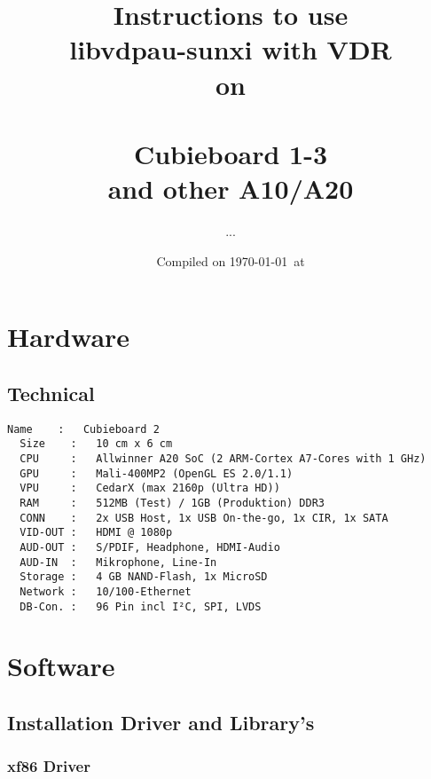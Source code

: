 \documentclass[11pt, a4paper,ngerman]{article}
\title{ Instructions to use \\ libvdpau-sunxi with VDR \\ on \\ \cubiebig \\ Cubieboard 1-3 \\ and other A10/A20}
\author{ ... }
\date{Compiled on \today\ at \currenttime}
\begin{document}
\maketitle
\newpage %
\tableofcontents 
\newpage %


\section{Hardware}
\subsection{Technical}
\begin{Verbatim}[frame=lines,
       framerule=0.2mm,framesep=3mm,
       rulecolor=\color{monoorange},
       fillcolor=\color{monogreen},
       label=\cubiebig,labelposition=topline]
  Name    :   Cubieboard 2
  Size    :   10 cm x 6 cm
  CPU     :   Allwinner A20 SoC (2 ARM-Cortex A7-Cores with 1 GHz)
  GPU     :   Mali-400MP2 (OpenGL ES 2.0/1.1)
  VPU     :   CedarX (max 2160p (Ultra HD))
  RAM     :   512MB (Test) / 1GB (Produktion) DDR3
  CONN    :   2x USB Host, 1x USB On-the-go, 1x CIR, 1x SATA
  VID-OUT :   HDMI @ 1080p
  AUD-OUT :   S/PDIF, Headphone, HDMI-Audio
  AUD-IN  :   Mikrophone, Line-In
  Storage :   4 GB NAND-Flash, 1x MicroSD
  Network :   10/100-Ethernet
  DB-Con. :   96 Pin incl I²C, SPI, LVDS
\end{Verbatim}

\section{Software}
\subsection{Installation Driver and Library's}

\subsubsection{xf86 Driver}
\end{document}
